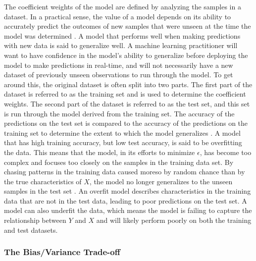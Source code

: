 \documentclass[sigconf]{acmart}
\begin{document}
The coefficient weights of the model are defined by analyzing the samples in a dataset. In a practical sense, the value of a model depends on its ability to accurately predict the outcomes of new samples that were unseen at the time the model was determined \cite{cite08}. A model that performs well when making predictions with new data is said to generalize well.
A machine learning practitioner will want to have confidence in the model's ability to generalize before deploying the model to make predictions in real-time, and will not necessarily have a new dataset of previously unseen observations to run through the model. To get around this, the original dataset is often split into two parts. The first part of the dataset is referred to as the training set and is used to determine the coefficient weights. The second part of the dataset is referred to as the test set, and this set is run through the model derived from the training set. The accuracy of the predictions on the test set is compared to the accuracy of the predictions on the training set to determine the extent to which the model generalizes \cite{cite08}.
A model that has high training accuracy, but low test accuracy, is said to be overfitting the data. This means that the model, in its efforts to minimize \(\epsilon\), has become too complex and focuses too closely on the samples in the training data set. By chasing patterns in the training data caused moreso by random chance than by the true characteristics of \(X\), the model no longer generalizes to the unseen samples in the test set \cite{cite03}\cite{cite08}. An overfit model describes characteristics in the training data that are not in the test data, leading to poor predictions on the test set.
A model can also underfit the data, which means the model is failing to capture the relationship between \(Y\) and \(X\) and will likely perform poorly on both the training and test datasets.

\subsubsection{The Bias/Variance Trade-off}
\end{document}
